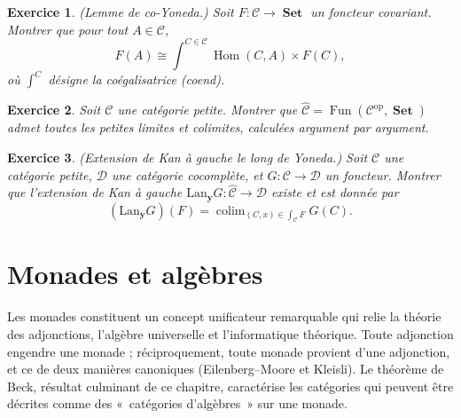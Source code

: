 \documentclass[a4paper,12pt]{book}
\DeclareMathOperator{\Hom}{Hom}
\DeclareMathOperator{\Fun}{Fun}
\DeclareMathOperator{\colim}{colim}
\DeclareMathOperator{\Set}{\mathbf{Set}}
\newcommand{\op}{\mathrm{op}}
\newtheorem{exercice}{Exercice}[chapter]
\begin{document}
\begin{exercice}\label{exo:coyoneda}
(\emph{Lemme de co-Yoneda.})
Soit $F \colon \mathcal{C} \to \Set$ un foncteur covariant.
Montrer que pour tout $A \in \mathcal{C}$,
\[
    F(A) \cong \int^{C \in \mathcal{C}} \Hom(C, A) \times F(C),
\]
où $\int^C$ désigne la coégalisatrice (coend).
\end{exercice}

\begin{exercice}\label{exo:presheaf-complete}
Soit $\mathcal{C}$ une catégorie petite. Montrer que
$\widehat{\mathcal{C}} = \Fun(\mathcal{C}^{\op}, \Set)$
admet toutes les petites limites et colimites, calculées
argument par argument.
\end{exercice}

\begin{exercice}\label{exo:yoneda-extension}
(\emph{Extension de Kan à gauche le long de Yoneda.})
Soit $\mathcal{C}$ une catégorie petite, $\mathcal{D}$ une catégorie
cocomplète, et $G \colon \mathcal{C} \to \mathcal{D}$ un foncteur.
Montrer que l'extension de Kan à gauche $\mathrm{Lan}_{\mathbf{y}} G
\colon \widehat{\mathcal{C}} \to \mathcal{D}$ existe et est donnée par
\[
    (\mathrm{Lan}_{\mathbf{y}} G)(F)
    = \colim_{(C, x) \in \int_{\mathcal{C}} F} G(C).
\]
\end{exercice}




\chapter{Monades et algèbres}\label{ch:monades}
\minitoc

\vspace{1em}

Les monades constituent un concept unificateur remarquable
qui relie la théorie des adjonctions, l'algèbre universelle et
l'informatique théorique.
Toute adjonction engendre une monade ; réciproquement, toute monade
provient d'une adjonction, et ce de deux manières canoniques
(Eilenberg--Moore et Kleisli).
Le théorème de Beck, résultat culminant de ce chapitre, caractérise
les catégories qui peuvent être décrites comme des «~catégories d'algèbres~»
sur une monade.
\end{document}
